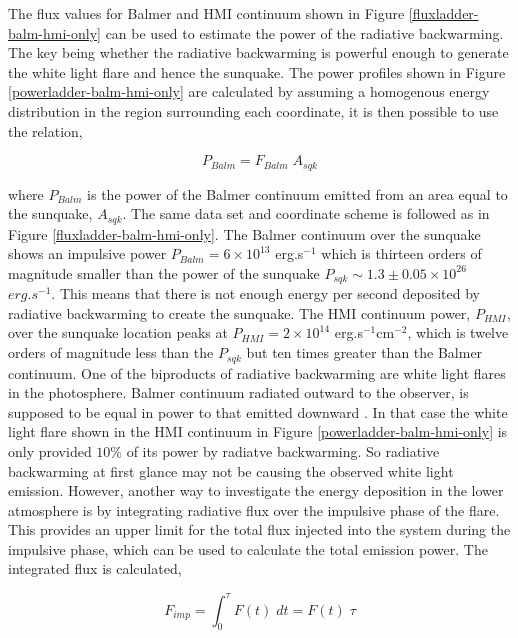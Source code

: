 \documentclass[11pt]{article}
\begin{document}
The flux values for Balmer and HMI continuum shown in Figure \ref{fluxladder-balm-hmi-only} can be used to estimate the power of the radiative backwarming. The key being whether the radiative backwarming is powerful enough to generate the white light flare and hence the sunquake. The power profiles shown in Figure \ref{powerladder-balm-hmi-only} are calculated by assuming a homogenous energy distribution in the region surrounding each coordinate, it is then possible to use the relation,

\begin{equation}
P_{Balm} = F_{Balm} \; A_{sqk}  
\end{equation}\label{Pbalm}

where $P_{Balm}$ is the power of the Balmer continuum emitted from an area equal to the sunquake, $A_{sqk}$. The same data set and coordinate scheme is followed as in Figure \ref{fluxladder-balm-hmi-only}. The Balmer continuum over the sunquake shows an impulsive power $P_{Balm} = 6{\times}10^{13}$ erg.s$^{-1}$ which is thirteen orders of magnitude smaller than the power of the sunquake $P_{sqk} \sim 1.3\pm0.05{\times}10^{26}$ $erg.s^{-1}$. This means that there is not enough energy per second deposited by radiative backwarming to create the sunquake. The HMI continuum power, $P_{HMI}$, over the sunquake location peaks at $P_{HMI} = 2{\times}10^{14}$ erg.s$^{-1}$cm$^{-2}$, which is twelve orders of magnitude less than the $P_{sqk}$ but ten times greater than the Balmer continuum. One of the biproducts of radiative backwarming are white light flares in the photosphere. Balmer continuum radiated outward to the observer, is supposed to be equal in power to that emitted downward \citep{1989SoPh..124..303M}. In that case the white light flare shown in the HMI continuum in Figure \ref{powerladder-balm-hmi-only} is only provided $10\%$ of its power by radiatve backwarming. So radiative backwarming at first glance may not be causing the observed white light emission. However, another way to investigate the energy deposition in the lower atmosphere is by integrating radiative flux over the impulsive phase of the flare. This provides an upper limit for the total flux injected into the system during the impulsive phase, which can be used to calculate the total emission power. The integrated flux is calculated,

\begin{equation}
F_{imp} = \int_{0}^{\tau} F(t) \; dt = F(t) \; \tau
\end{equation}\label{f-imp}
 
\end{document}
